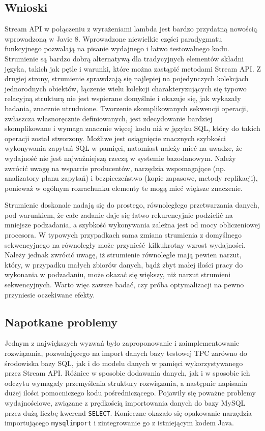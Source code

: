 \documentclass[12pt]{extarticle}
\begin{document}
\subsection{Wnioski}

    Stream API w połączeniu z wyrażeniami lambda jest bardzo przydatną nowością wprowadzoną w Javie 8. Wprowadzone niewielkie części paradygmatu funkcyjnego pozwalają na pisanie wydajnego i łatwo testowalnego kodu. Strumienie są bardzo dobrą alternatywą dla tradycyjnych elementów składni języka, takich jak pętle i warunki, które można zastąpić metodami Stream API. Z drugiej strony, strumienie sprawdzają się najlepiej na pojedynczych kolekcjach jednorodnych obiektów, łączenie wielu kolekcji charakteryzujących się typowo relacyjną strukturą nie jest wspierane domyślnie i okazuje się, jak wykazały badania, znacznie utrudnione. Tworzenie skomplikowanych sekwencji operacji, zwłaszcza własnoręcznie definiowanych, jest zdecydowanie bardziej skomplikowane i wymaga znacznie więcej kodu niż w języku SQL, który do takich operacji został stworzony. Możliwe jest osiągnięcie znacznych szybkości wykonywania zapytań SQL w pamięci, natomiast należy mieć na uwadze, że wydajność nie jest najważniejszą rzeczą w systemie bazodanowym. Należy zwrócić uwagę na wsparcie producentów, narzędzia wspomagające (np. analizatory planu zapytań) i bezpieczeństwo (kopie zapasowe, metody replikacji), ponieważ w ogólnym rozrachunku elementy te mogą mieć większe znaczenie.

    Strumienie doskonale nadają się do prostego, równoległego przetwarzania danych, pod warunkiem, że całe zadanie daje się łatwo rekurencyjnie podzielić na mniejsze podzadania, a szybkość wykonywania zależna jest od mocy obliczeniowej procesora. W typowych przypadkach sama zmiana strumienia z domyślnego sekwencyjnego na równoległy może przynieść kilkukrotny wzrost wydajności. Należy jednak zwrócić uwagę, iż strumienie równoległe mają pewien narzut, który, w przypadku małych zbiorów danych, bądź zbyt małej ilości pracy do wykonania w podzadaniu, może okazać się większy, niż narzut strumieni sekwencyjnych. Warto więc zawsze badać, czy próba optymalizacji na pewno przyniesie oczekiwane efekty.


\subsection{Napotkane problemy}

    Jednym z największych wyzwań było zaproponowanie i zaimplementowanie rozwiązania, pozwalającego na import danych bazy testowej TPC zarówno do środowiska bazy SQL, jak i do modelu danych w pamięci wykorzystywanego przez Stream API. Różnice w sposobie dodawania danych, jak i w sposobie ich odczytu wymagały przemyślenia struktury rozwiązania, a następnie napisania dużej ilości pomocniczego kodu pośredniczącego. Pojawiły się poważne problemy wydajnościowe, związane z prędkością importowania danych do bazy MySQL przez dużą liczbę kwerend \texttt{SELECT}. Konieczne okazało się opakowanie narzędzia importującego \texttt{mysqlimport} i zintegrowanie go z istniejącym kodem Java.
\end{document}
